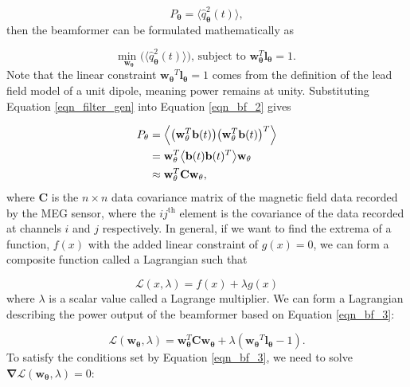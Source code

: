 \begin{equation} \label{eqn_bf_2}
P_{\mathbf\theta} = \big\langle\hat{q}^2_{\mathbf\theta}(t)\big\rangle,
\end{equation}
then the beamformer can be formulated mathematically as 

\begin{equation} \label{eqn_bf_3}
\underset{\mathbf{w_\theta}}{\text{min }}\big(\langle\hat{q}^2_{\mathbf\theta}(t)\rangle\big)\text{, subject to } \mathbf{w}_{\mathbf{\theta}}^T\mathbf{l_\theta} = 1.
\end{equation}
Note that the linear constraint  $\mathbf{w_\theta}^T\mathbf{l_\theta} = 1$ comes from the definition of the lead field model of a unit dipole, meaning power remains at unity. Substituting Equation \ref{eqn_filter_gen} into Equation \ref{eqn_bf_2} gives

\begin{equation}
\begin{aligned}\label{eqn_bf_4}
P_{\mathbf\theta} &= \Big\langle \big(\mathbf{w}^T_{\mathbf\theta}\mathbf{b}(t)\big)\big(\mathbf{w}^T_{\mathbf\theta}\mathbf{b}(t)\big)^T\Big\rangle \\
&= \mathbf{w}^T_{\mathbf\theta}\big{\langle}\mathbf{b}(t)\mathbf{b}(t)^T\big\rangle\mathbf{w}_{\mathbf\theta}\\
&\approx \mathbf{w}^T_{\mathbf\theta}\mathbf{C}\mathbf{w}_{\mathbf\theta},
\end{aligned}
\end{equation}
where $\mathbf{C}$ is the $n \times n$ data covariance matrix of the magnetic field data recorded by the MEG sensor, where the $ij^{\text{th}}$ element is the covariance of the data recorded at channels $i$ and $j$ respectively. In general, if we want to find the extrema of a function, $f(x)$ with the added linear constraint of $g(x)=0$, we can form a composite function called a Lagrangian such that

\begin{equation}
	\mathscr{L}(x,\lambda) = f(x) + \lambda g(x)
\end{equation} where $\lambda$ is a scalar value called a Lagrange multiplier. We can form a Lagrangian describing the power output of the beamformer based on Equation \ref{eqn_bf_3}:

\begin{equation}\label{eqn_bf_8}
\mathscr{L}(\mathbf{w_\theta},\lambda ) = \mathbf{w}^T_{\mathbf\theta}\mathbf{C}\mathbf{w}_{\mathbf\theta} + \lambda (\mathbf{w_\theta}^T\mathbf{l_\theta} - 1).
\end{equation} To satisfy the conditions set by Equation \ref{eqn_bf_3}, we need to solve $\mathbf{\nabla}\mathscr{L}(\mathbf{w_\theta},\lambda )=0$:

